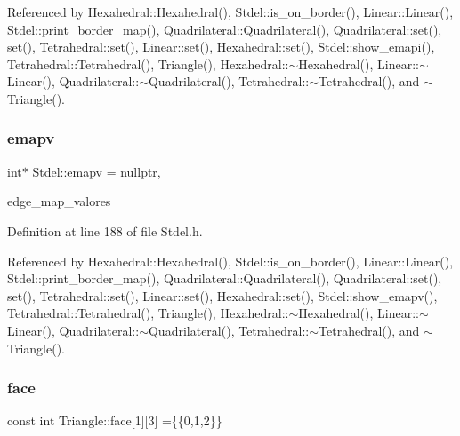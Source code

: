Referenced by Hexahedral\+::\+Hexahedral(), Stdel\+::is\+\_\+on\+\_\+border(), Linear\+::\+Linear(), Stdel\+::print\+\_\+border\+\_\+map(), Quadrilateral\+::\+Quadrilateral(), Quadrilateral\+::set(), set(), Tetrahedral\+::set(), Linear\+::set(), Hexahedral\+::set(), Stdel\+::show\+\_\+emapi(), Tetrahedral\+::\+Tetrahedral(), Triangle(), Hexahedral\+::$\sim$\+Hexahedral(), Linear\+::$\sim$\+Linear(), Quadrilateral\+::$\sim$\+Quadrilateral(), Tetrahedral\+::$\sim$\+Tetrahedral(), and $\sim$\+Triangle().

\mbox{\label{classStdel_a39326d0ef108403223402c79b424a41b}} 
\subsubsection{\texorpdfstring{emapv}{emapv}}
{\footnotesize\ttfamily int$\ast$ Stdel\+::emapv = nullptr\hspace{0.3cm}{\ttfamily [protected]}, {\ttfamily [inherited]}}



edge\+\_\+map\+\_\+valores 



Definition at line 188 of file Stdel.\+h.



Referenced by Hexahedral\+::\+Hexahedral(), Stdel\+::is\+\_\+on\+\_\+border(), Linear\+::\+Linear(), Stdel\+::print\+\_\+border\+\_\+map(), Quadrilateral\+::\+Quadrilateral(), Quadrilateral\+::set(), set(), Tetrahedral\+::set(), Linear\+::set(), Hexahedral\+::set(), Stdel\+::show\+\_\+emapv(), Tetrahedral\+::\+Tetrahedral(), Triangle(), Hexahedral\+::$\sim$\+Hexahedral(), Linear\+::$\sim$\+Linear(), Quadrilateral\+::$\sim$\+Quadrilateral(), Tetrahedral\+::$\sim$\+Tetrahedral(), and $\sim$\+Triangle().

\mbox{\label{classTriangle_a693659752f394140a7ad5010208b3ab0}} 
\subsubsection{\texorpdfstring{face}{face}}
{\footnotesize\ttfamily const int Triangle\+::face\mbox{[}1\mbox{]}\mbox{[}3\mbox{]} =\{\{0,1,2\}\}\hspace{0.3cm}{\ttfamily [private]}}




